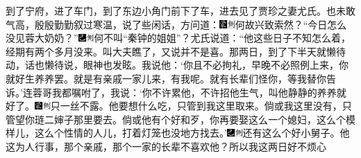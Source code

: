 到了宁府，进了车门，到了东边小角门前下了车，进去见了贾珍之妻尤氏。也未敢气高，殷殷勤勤叙过寒温，说了些闲话，方问道：{\includegraphics[width=3mm]{../Images/00006}\includegraphics[width=3mm]{../Images/00011}\footnotesize \kaishu 何故兴致索然？}“今日怎么没见蓉大奶奶？”{\includegraphics[width=3mm]{../Images/00003}\includegraphics[width=3mm]{../Images/00011}\footnotesize \kaishu 何不叫“秦钟的姐姐”？}尤氏说道：“他这些日子不知怎么着，经期有两个多月没来。叫大夫瞧了，又说并不是喜。那两日，到了下半天就懒待动，话也懒待说，眼神也发眩。我说他：‘你且不必拘礼，早晚不必照例上来，你就好生养养罢。就是有亲戚一家儿来，有我呢。就有长辈们怪你，等我替你告诉。’连蓉哥我都嘱咐了，我说：‘你不许累他，不许招他生气，叫他静静的养养就好了。{\includegraphics[width=3mm]{../Images/00006}\includegraphics[width=3mm]{../Images/00011}\footnotesize \kaishu 只一丝不露。}他要想什么吃，只管到我这里取来。倘或我这里没有，只管望你琏二婶子那里要去。倘或他有个好和歹，你再要娶这么一个媳妇，这么个模样儿，这么个性情的人儿，打着灯笼也没地方找去。’{\includegraphics[width=3mm]{../Images/00003}\includegraphics[width=3mm]{../Images/00011}\footnotesize \kaishu 还有这么个好小舅子。}他这为人行事，那个亲戚，那个一家的长辈不喜欢他？所以我这两日好不烦心